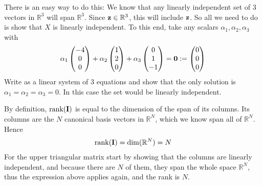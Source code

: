 \documentclass[letterpaper,10pt,english]{jupyterBook}
\begin{document}
\sphinxAtStartPar
{}

\sphinxAtStartPar
There is an easy way to do this: We know that any linearly
independent set of 3 vectors in \(\mathbb{R}^3\) will span \(\mathbb{R}^3\). Since \({\bf z} \in \mathbb{R}^3\), this will include \({\bf z}\). So all we need to do is
show that \(X\) is linearly independent. To this end, take any scalars
\(\alpha_1, \alpha_2, \alpha_3\) with
\begin{equation*}
\begin{split}
\alpha_1
\begin{pmatrix}
-4 \\
0 \\
0
\end{pmatrix}
+
\alpha_2
\begin{pmatrix}
1 \\
2 \\
0
\end{pmatrix}
+
\alpha_3
\begin{pmatrix}
0 \\
1 \\
-1
\end{pmatrix}
=
{\bf 0}
:=
\begin{pmatrix}
0 \\
0 \\
0
\end{pmatrix}
\end{split}
\end{equation*}
\sphinxAtStartPar
Write as a linear system of 3 equations and show that the only solution is \(\alpha_1=\alpha_2=\alpha_3=0\).
In this case the set would be linearly independent.

\sphinxAtStartPar
{}

\sphinxAtStartPar
By definition, \(\mathrm{rank}({\bf I})\) is equal to the dimension of the span of
its columns. Its columns are the \(N\) canonical basis vectors in \(\mathbb{R}^N\),
which we know span all of \(\mathbb{R}^N\). Hence
\begin{equation*}
\begin{split}
\mathrm{rank}({\bf I}) = \dim(\mathbb{R}^N) = N
\end{split}
\end{equation*}
\sphinxAtStartPar
{}
For the upper triangular matrix start by showing that the columns are linearly independent, and because there are \(N\) of them, they span the whole space \(\mathbb{R}^N\), thus the expression above applies again, and the rank is \(N\).
\end{document}
